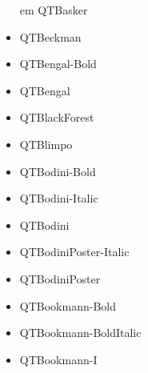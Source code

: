 \documentclass[12pt]{article}
\begin{document}
\begin{itemize}
em QTBasker\item QTBeckman\item QTBengal-Bold\item QTBengal\item QTBlackForest\item QTBlimpo\item QTBodini-Bold\item QTBodini-Italic\item QTBodini\item QTBodiniPoster-Italic\item QTBodiniPoster\item QTBookmann-Bold\item QTBookmann-BoldItalic\item QTBookmann-I
\end{itemize}
\end{document}
